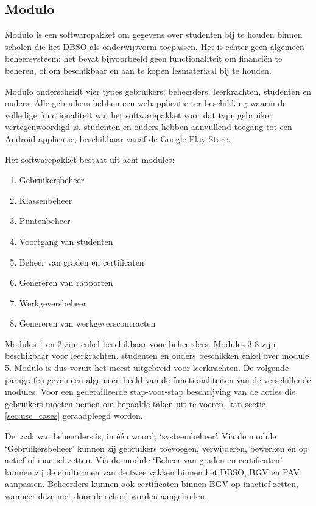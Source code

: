 \documentclass[a4paper]{article}
\begin{document}
\subsection{Modulo}
Modulo is een softwarepakket om gegevens over studenten bij te houden binnen scholen die het DBSO als onderwijsvorm toepassen. Het is echter geen algemeen beheersysteem; het bevat bijvoorbeeld geen functionaliteit om financiën te beheren, of om beschikbaar en aan te kopen lesmateriaal bij te houden.

Modulo onderscheidt vier types gebruikers: beheerders, leerkrachten, studenten en ouders. Alle gebruikers hebben een webapplicatie ter beschikking waarin de volledige functionaliteit van het softwarepakket voor dat type gebruiker vertegenwoordigd is. studenten en ouders hebben aanvullend toegang tot een Android applicatie, beschikbaar vanaf de Google Play Store.

\newpage
Het softwarepakket bestaat uit acht modules:

\begin{enumerate}
    \item Gebruikersbeheer
    \item Klassenbeheer
    \item Puntenbeheer
    \item Voortgang van studenten
    \item Beheer van graden en certificaten
    \item Genereren van rapporten
    \item Werkgeversbeheer
    \item Genereren van werkgeverscontracten
\end{enumerate}

Modules 1 en 2 zijn enkel beschikbaar voor beheerders. Modules 3-8 zijn beschikbaar voor leerkrachten. studenten en ouders beschikken enkel over module 5. Modulo is dus veruit het meest uitgebreid voor leerkrachten. De volgende paragrafen geven een algemeen beeld van de functionaliteiten van de verschillende modules. Voor een gedetailleerde stap-voor-stap beschrijving van de acties die gebruikers moeten nemen om bepaalde taken uit te voeren, kan sectie \ref{sec:use_cases} geraadpleegd worden.

De taak van beheerders is, in één woord, `systeembeheer'. Via de module `Gebruikersbeheer' kunnen zij gebruikers toevoegen, verwijderen, bewerken en op actief of inactief zetten. Via de module `Beheer van graden en certificaten' kunnen zij de eindtermen van de twee vakken binnen het DBSO, BGV en PAV, aanpassen. Beheerders kunnen ook certificaten binnen BGV op inactief zetten, wanneer deze niet door de school worden aangeboden.
\end{document}
